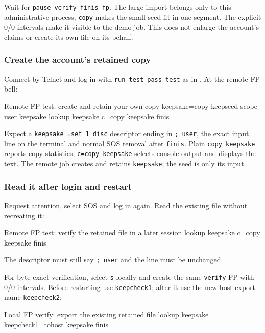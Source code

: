 Wait for \texttt{pause verify finis fp}. The large import belongs only to this
administrative process; \texttt{copy} makes the small seed fit in one segment.
The explicit 0/0 intervals make it visible to the demo job. This does not enlarge
the account's claims or create its own file on its behalf.

\subsubsection{Create the account's retained copy}

Connect by Telnet and log in with \texttt{run test pass test} as in
. At the remote FP bell:

\begin{commandexample}{Remote FP test: create and retain your own copy}
keepsake=copy keepseed
scope user keepsake
lookup keepsake
c=copy keepsake
finis
\end{commandexample}

Expect a \texttt{keepsake =set 1 disc} descriptor ending in \texttt{; user},
the exact input line on the terminal and normal SOS removal after
\texttt{finis}. Plain \texttt{copy keepsake} reports copy statistics;
\texttt{c=copy keepsake} selects console output and displays the text.
The remote job creates and retains \texttt{keepsake}; the seed is only its input.

\subsubsection{Read it after login and restart}

Request attention, select SOS and log in again. Read the existing file without
recreating it:

\begin{commandexample}{Remote FP test: verify the retained file in a later session}
lookup keepsake
c=copy keepsake
finis
\end{commandexample}

The descriptor must still say \texttt{; user} and the line must be unchanged.

For byte-exact verification, select \texttt{s} locally and create the same
\texttt{verify} FP with 0/0 intervals. Before restarting use \texttt{keepcheck1};
after it use the new host export name \texttt{keepcheck2}:

\begin{commandexample}{Local FP verify: export the existing retained file}
lookup keepsake
keepcheck1=tohost keepsake
finis
\end{commandexample}

